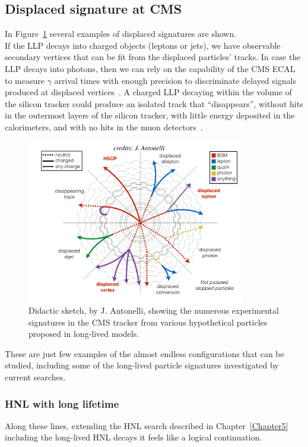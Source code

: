 \subsection{Displaced signature at CMS}
In Figure~\ref{fig:c6antonelli} several examples of displaced
signatures are shown.\\
If the LLP decays into charged objects (leptons or jets), we have
observable secondary vertices that can be fit from the displaced
particles' tracks.
In case the LLP decays into photons,
then we can rely on the capability of the CMS
ECAL to measure $\gamma$ arrival times with enough precision to
discriminate delayed signals produced at displaced
vertices~\cite{Sirunyan:2019wau}.
A charged LLP decaying within the volume of the silicon tracker could produce an isolated track
that ``disappears'', \ie without hits in the outermost layers of the
silicon tracker, with little energy deposited in the calorimeters, and
with no hits in the muon detectors~\cite{Sirunyan_2020disapp}.  
\begin{figure}[h]
\centering
\includegraphics[clip,trim=0cm 0.cm 0.cm 1.6cm, width=0.85\textwidth]{Figures/c6/antonelli_skech.pdf}
\caption{Didactic sketch, by J. Antonelli, showing the numerous
  experimental signatures in the CMS tracker from various hypothetical particles proposed in long-lived models. }
\label{fig:c6antonelli}
\end{figure}

These are just few examples of the almost endless configurations that can
be studied, including some of the 
long-lived particle
signatures investigated by current searches. 

\subsubsection{HNL with long lifetime}
Along these lines, extending the HNL search described in
Chapter~\ref{Chapter5} including the long-lived HNL decays it feels like a logical
continuation. 

